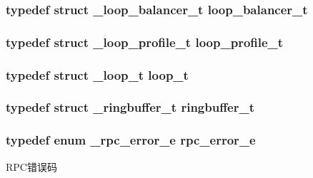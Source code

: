 \subsubsection[{loop\+\_\+balancer\+\_\+t}]{\setlength{\rightskip}{0pt plus 5cm}typedef struct {\bf \+\_\+loop\+\_\+balancer\+\_\+t} {\bf loop\+\_\+balancer\+\_\+t}}\label{a00051_a649c7e850ab247b5f70ad27e335a129d_a649c7e850ab247b5f70ad27e335a129d}
\hypertarget{a00051_ad060e1396346d2f5db1ec0597376a107_ad060e1396346d2f5db1ec0597376a107}{}
\subsubsection[{loop\+\_\+profile\+\_\+t}]{\setlength{\rightskip}{0pt plus 5cm}typedef struct {\bf \+\_\+loop\+\_\+profile\+\_\+t} {\bf loop\+\_\+profile\+\_\+t}}\label{a00051_ad060e1396346d2f5db1ec0597376a107_ad060e1396346d2f5db1ec0597376a107}
\hypertarget{a00051_a9c3ad1cd2de83e09f3a7b59fa82c94ee_a9c3ad1cd2de83e09f3a7b59fa82c94ee}{}
\subsubsection[{loop\+\_\+t}]{\setlength{\rightskip}{0pt plus 5cm}typedef struct {\bf \+\_\+loop\+\_\+t} {\bf loop\+\_\+t}}\label{a00051_a9c3ad1cd2de83e09f3a7b59fa82c94ee_a9c3ad1cd2de83e09f3a7b59fa82c94ee}
\hypertarget{a00051_af929c5cf86b6a0f64dde407dfe60482e_af929c5cf86b6a0f64dde407dfe60482e}{}
\subsubsection[{ringbuffer\+\_\+t}]{\setlength{\rightskip}{0pt plus 5cm}typedef struct {\bf \+\_\+ringbuffer\+\_\+t} {\bf ringbuffer\+\_\+t}}\label{a00051_af929c5cf86b6a0f64dde407dfe60482e_af929c5cf86b6a0f64dde407dfe60482e}
\hypertarget{a00051_aba1e847dfcabe31256c7f60abe0272a6_aba1e847dfcabe31256c7f60abe0272a6}{}
\subsubsection[{rpc\+\_\+error\+\_\+e}]{\setlength{\rightskip}{0pt plus 5cm}typedef enum {\bf \+\_\+rpc\+\_\+error\+\_\+e}  {\bf rpc\+\_\+error\+\_\+e}}\label{a00051_aba1e847dfcabe31256c7f60abe0272a6_aba1e847dfcabe31256c7f60abe0272a6}
R\+P\+C错误码 \hypertarget{a00051_a261dba04f46f5c59a68a05f69f5a65a8_a261dba04f46f5c59a68a05f69f5a65a8}{}
